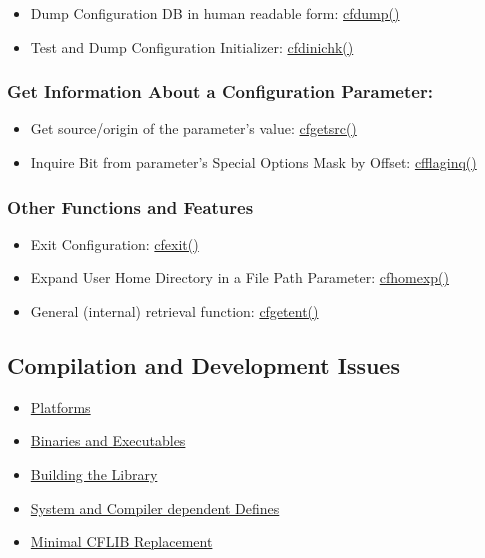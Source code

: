 \begin{itemize}
\item Dump Configuration DB in human readable form: \hyperlink{group__advanced__features_gecfc8ee37366e1b36cb5aac0cc41ebdc}{cfdump()}\item Test and Dump Configuration Initializer: \hyperlink{group__advanced__features_g35e2c28f591ac71e3617c612233ecdd0}{cfdinichk()}\end{itemize}
\hypertarget{index_metainfos}{}\subsubsection{Get Information About a Configuration Parameter:}\label{index_metainfos}
\begin{itemize}
\item Get source/origin of the parameter's value: \hyperlink{group__retrieval_gdf84eed41bdaa0a6cd8cd474c79d50b1}{cfgetsrc()}\item Inquire Bit from parameter's Special Options Mask by Offset: \hyperlink{group__retrieval_g09929d4a48932749dd9d0d32d0f3f08c}{cfflaginq()}\end{itemize}
\hypertarget{index_advanced_other}{}\subsubsection{Other Functions and Features}\label{index_advanced_other}
\begin{itemize}
\item Exit Configuration: \hyperlink{group__cflib__core_g47bfff42f432b3e8b5b9f12b695e60db}{cfexit()}\item Expand User Home Directory in a File Path Parameter: \hyperlink{group__advanced__features_gb6f874ac347d273dc45ad011808fe703}{cfhomexp()}\item General (internal) retrieval function: \hyperlink{group__retrieval_g872f83b13a8f722176f5e299f2a42e0f}{cfgetent()}\end{itemize}
\hypertarget{index_compilation_issues}{}\subsection{Compilation and Development Issues}\label{index_compilation_issues}
\begin{itemize}
\item \hyperlink{development_platforms}{Platforms}\item \hyperlink{development_binaries}{Binaries and Executables}\item \hyperlink{development_library_building}{Building the Library}\item \hyperlink{development_compilation_options}{System and Compiler dependent Defines}\item \hyperlink{development_minimal_replacement}{Minimal CFLIB Replacement}\end{itemize}
